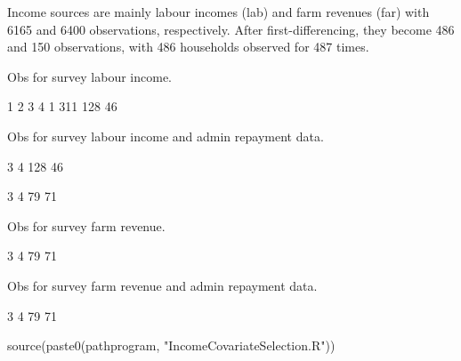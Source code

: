Income sources are mainly labour incomes (\textsf{lab}) and farm revenues (\textsf{far}) with 6165 and 6400 observations, respectively. After first-differencing, they become 486 and 150 observations, with 486 households observed for 487 times. 


Obs for survey labour income.
\begin{Schunk}
\begin{Soutput}

  1   2   3   4 
  1 311 128  46 
\end{Soutput}
\end{Schunk}
Obs for survey labour income and admin repayment data.
\begin{Schunk}
\begin{Soutput}

  3   4 
128  46 
\end{Soutput}
\begin{Soutput}

 3  4 
79 71 
\end{Soutput}
\end{Schunk}
Obs for survey farm revenue.
\begin{Schunk}
\begin{Soutput}

 3  4 
79 71 
\end{Soutput}
\end{Schunk}
Obs for survey farm revenue and admin repayment data.
\begin{Schunk}
\begin{Soutput}

 3  4 
79 71 
\end{Soutput}
\end{Schunk}

\begin{Schunk}
\begin{Sinput}
source(paste0(pathprogram, "IncomeCovariateSelection.R"))
\end{Sinput}
\end{Schunk}





